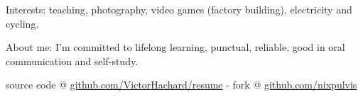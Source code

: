





\vspace{4px}











\vspace{10px}

\begin{indentsection}{\parindent}
\begin{description*}
  \item[Interests:]
    teaching, photography, video games (factory building), electricity and cycling.
  \item[About me:]
    I’m committed to lifelong learning, punctual, reliable,
    good in oral communication and self-study.
\end{description*}
\end{indentsection}

\vspace{4px}

\begin{center}
\footnotesize \latex source code @
\href{http://www.github.com/VictorHachard/resume}
{github.com/VictorHachard/resume} - fork @
\href{http://www.github.com/nixpulvis}
{github.com/nixpulvis}
\end{center}

